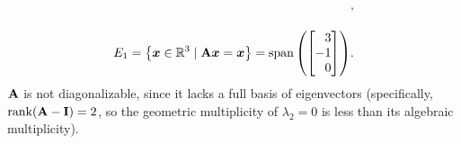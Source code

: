 \documentclass[11pt]{article}
\begin{document}
\begin{enumerate}
\begin{enumerate}
\[\begin{aligned}
                            \! ,
                            \\[1em]
                            E_{1} = \set{ \x \in \R^3 \mid \mat{A} \x = \x } = \Span \args{
                                \begin{bmatrix*}[r]
                                    3 \\ -1 \\ 0
                                \end{bmatrix*}
                            }
                            \! .
                        \end{aligned}
                    \]
                    $\mathbf{A}$ is not diagonalizable, since it lacks a full basis of eigenvectors
                    (specifically, $\operatorname{rank}(\mathbf{A} - \mathbf{I}) = 2$, so the geometric multiplicity of
                    $\lambda_2 = 0$ is less than its algebraic multiplicity).


\end{enumerate}
\end{enumerate}
\end{document}
